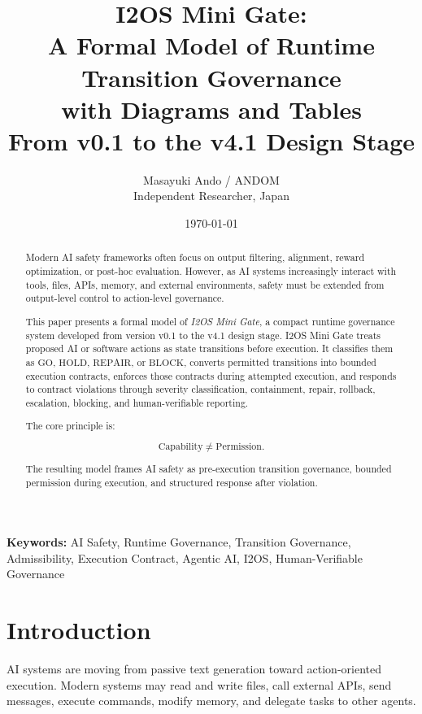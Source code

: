 \documentclass[11pt,a4paper]{article}
\title{
\textbf{I2OS Mini Gate:}\\
A Formal Model of Runtime Transition Governance\\
with Diagrams and Tables\\
\large From v0.1 to the v4.1 Design Stage
}
\author{
Masayuki Ando / ANDOM\\
Independent Researcher, Japan
}
\date{\today}
\newcommand{\GO}{\mathrm{GO}}
\newcommand{\HOLD}{\mathrm{HOLD}}
\newcommand{\REPAIR}{\mathrm{REPAIR}}
\newcommand{\BLOCK}{\mathrm{BLOCK}}
\begin{document}
\maketitle


\begin{abstract}
Modern AI safety frameworks often focus on output filtering, alignment, reward optimization, or post-hoc evaluation.
However, as AI systems increasingly interact with tools, files, APIs, memory, and external environments, safety must be extended from output-level control to action-level governance.

This paper presents a formal model of \textit{I2OS Mini Gate}, a compact runtime governance system developed from version v0.1 to the v4.1 design stage.
I2OS Mini Gate treats proposed AI or software actions as state transitions before execution.
It classifies them as \(\GO\), \(\HOLD\), \(\REPAIR\), or \(\BLOCK\), converts permitted transitions into bounded execution contracts, enforces those contracts during attempted execution, and responds to contract violations through severity classification, containment, repair, rollback, escalation, blocking, and human-verifiable reporting.

The core principle is:

\[
\mathrm{Capability} \neq \mathrm{Permission}.
\]

The resulting model frames AI safety as pre-execution transition governance, bounded permission during execution, and structured response after violation.
\end{abstract}

\textbf{Keywords:} AI Safety, Runtime Governance, Transition Governance, Admissibility, Execution Contract, Agentic AI, I2OS, Human-Verifiable Governance

\newpage
\tableofcontents
\newpage

\section{Introduction}

AI systems are moving from passive text generation toward action-oriented execution.
Modern systems may read and write files, call external APIs, send messages, execute commands, modify memory, and delegate tasks to other agents.
\end{document}
